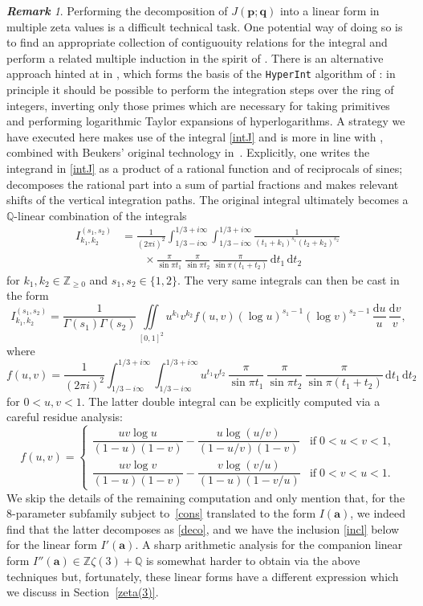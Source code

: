 \documentclass[12pt,reqno]{amsart}
\theoremstyle{remark}
\newtheorem{remark}{\bf Remark}
\renewcommand{\d}{{\mathrm d}}
\newcommand\ba{\boldsymbol a}
\newcommand\bp{\boldsymbol p}
\newcommand\bq{\boldsymbol q}
\begin{document}
\begin{remark}
\label{rem-decom}
Performing the decomposition of $J(\bp;\bq)$ into a linear form in multiple zeta values is a difficult technical task.
One potential way of doing so is to find an appropriate collection of contiguouity relations for the integral and perform a related multiple induction in the spirit of \cite{RV96,RV01}.
There is an alternative approach hinted at in \cite{Br09}, which forms the basis of the \texttt{HyperInt} algorithm of \cite{Pa15}: in principle it should be possible to perform the integration  steps over the ring of integers, inverting only those primes which are necessary for taking primitives and performing logarithmic Taylor expansions of hyperlogarithms.  
A strategy we have executed here makes use of the integral \eqref{intJ} and is more in line with \cite{MZ20,Zu04,Zu14}, combined with Beukers' original technology in~\cite{Be79}.
Explicitly, one writes the integrand in \eqref{intJ} as a product of  a rational function and of reciprocals of sines;
decomposes the rational part into a sum of partial fractions and makes relevant shifts of the vertical integration paths. 
The original integral ultimately  becomes a $\mathbb Q$-linear combination of the integrals
\begin{align*}
I_{k_1,k_2}^{(s_1,s_2)}
&=\frac1{(2\pi i)^2}\int_{1/3-i\infty}^{1/3+i\infty}\!\int_{1/3-i\infty}^{1/3+i\infty}
\frac1{(t_1+k_1)^{s_1}(t_2+k_2)^{s_2}}\,
\\ &\qquad\times
\frac\pi{\sin\pi t_1}\,\frac\pi{\sin\pi t_2}\,\frac\pi{\sin\pi(t_1+t_2)}\,\d t_1\,\d t_2
\end{align*}
for $k_1,k_2\in\mathbb Z_{\ge0}$ and $s_1,s_2\in\{1,2\}$.
The very same integrals can then  be  cast in the form
\[
I_{k_1,k_2}^{(s_1,s_2)}
=\frac1{\Gamma(s_1)\Gamma(s_2)}\iint\limits_{[0,1]^2}u^{k_1}v^{k_2}f(u,v)(\log u)^{s_1-1}(\log v)^{s_2-1}\,\frac{\d u}u\,\frac{\d v}v,
\]
where
\[
f(u,v)=\frac1{(2\pi i)^2}\int_{1/3-i\infty}^{1/3+i\infty}\!\int_{1/3-i\infty}^{1/3+i\infty}
u^{t_1}v^{t_2}\,\frac\pi{\sin\pi t_1}\,\frac\pi{\sin\pi t_2}\,\frac\pi{\sin\pi(t_1+t_2)}\,\d t_1\,\d t_2
\]
for $0<u,v<1$. The latter double integral can be explicitly computed via a careful residue analysis:
\[
f(u,v)=\begin{cases}
\dfrac{uv\log u}{(1-u)(1-v)}-\dfrac{u\log(u/v)}{(1-u/v)(1-v)} &\text{if}\; 0<u<v<1,  \\[3pt]
\dfrac{uv\log v}{(1-u)(1-v)}-\dfrac{v\log(v/u)}{(1-u)(1-v/u)} &\text{if}\; 0<v<u<1.
\end{cases}
\]
We skip the  details of the remaining computation and only mention that, for the 8-parameter subfamily subject to~\eqref{cons} translated to the form $I(\ba)$, we indeed find that the latter decomposes as \eqref{deco}, and we have the inclusion \eqref{incl} below  for the  linear form $I'(\ba)$.
A sharp arithmetic analysis  for the companion linear form $I''(\ba)\in\mathbb Z\zeta(3)+\mathbb Q$ is somewhat harder to obtain via the above techniques 
but, fortunately, these linear forms have a different expression which we discuss in Section~\ref{zeta(3)}.
\end{remark}
\end{document}
